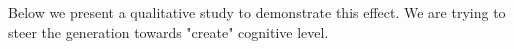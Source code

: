 \begin{comment}
We explored using alternative model components beyond query attention heads for generation control. Specifically, we trained SAEs on the residual stream at layer 15,5,25 but observed no meaningful impact on steering the output. This aligns with our understanding, as residual streams aggregate information from previous layers, potentially diluting the precise control needed for targeted content modulation. In contrast, the query attention head proved more effective, as it specifically handles token relationships, making it well-suited for understanding context and guiding the generation process.
\end{comment}


Below we present a qualitative study to demonstrate this effect. We are trying to steer the generation towards "create" cognitive level.







